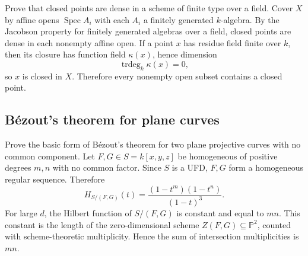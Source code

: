 \documentclass[12pt]{article}
\theoremstyle{plain}
\theoremstyle{definition}
\newcommand{\bb}[1]{\mathbb{#1}}
\newcommand{\Spec}{\operatorname{Spec}}
\begin{document}
\questionpar Prove that closed points are dense in a scheme of finite type over a field.
\solutionpar Cover $X$ by affine opens $\Spec A_i$ with each $A_i$ a finitely generated $k$-algebra. By the Jacobson property for finitely generated algebras over a field, closed points are dense in each nonempty affine open. If a point $x$ has residue field finite over $k$, then its closure has function field $\kappa(x)$, hence dimension
\[
\operatorname{trdeg}_k\kappa(x)=0,
\]
so $x$ is closed in $X$. Therefore every nonempty open subset contains a closed point.

\subsection{B\'ezout's theorem for plane curves}

\questionpar Prove the basic form of B\'ezout's theorem for two plane projective curves with no common component.
\solutionpar Let $F,G\in S=k[x,y,z]$ be homogeneous of positive degrees $m,n$ with no common factor. Since $S$ is a UFD, $F,G$ form a homogeneous regular sequence. Therefore
\[
H_{S/(F,G)}(t)=\frac{(1-t^m)(1-t^n)}{(1-t)^3}.
\]
For large $d$, the Hilbert function of $S/(F,G)$ is constant and equal to $mn$. This constant is the length of the zero-dimensional scheme $Z(F,G)\subseteq\bb P^2$, counted with scheme-theoretic multiplicity. Hence the sum of intersection multiplicities is $mn$.


\clearpage
\end{document}
